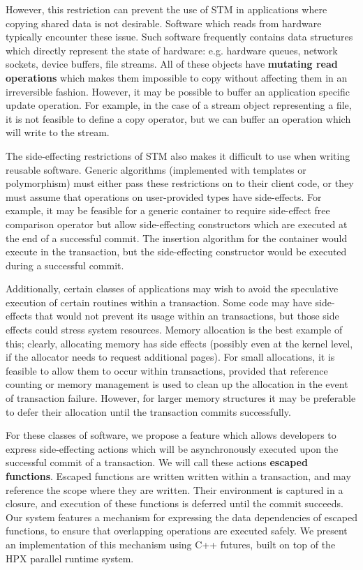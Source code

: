 \documentclass[conference]{IEEEtran}
\begin{document}
However, this restriction can prevent the use of STM in applications where copying shared data is not desirable. Software which reads from hardware typically encounter these issue. Such software frequently contains data structures which directly represent the state of hardware: e.g. hardware queues, network sockets, device buffers, file streams. All of these objects have \textbf{mutating read operations} which makes them impossible to copy without affecting them in an irreversible fashion. However, it may be possible to buffer an application specific update operation. For example, in the case of a stream object representing a file, it is not feasible to define a copy operator, but we can buffer an operation which will write to the stream. 

The side-effecting restrictions of STM also makes it difficult to use when writing reusable software. Generic algorithms (implemented with templates or polymorphism) must either pass these restrictions on to their client code, or they must assume that operations on user-provided types have side-effects. For example, it may be feasible for a generic container to require side-effect free comparison operator but allow side-effecting constructors which are executed at the end of a successful commit. The insertion algorithm for the container would execute in the transaction, but the side-effecting constructor would be executed during a successful commit.

Additionally, certain classes of applications may wish to avoid the speculative execution of certain routines within a transaction. Some code may have side-effects that would not prevent its usage within an transactions, but those side effects could stress system resources. Memory allocation is the best example of this; clearly, allocating memory has side effects (possibly even at the kernel level, if the allocator needs to request additional pages). For small allocations, it is feasible to allow them to occur within transactions, provided that reference counting or memory management is used to clean up the allocation in the event of transaction failure. However, for larger memory structures it may be preferable to defer their allocation until the transaction commits successfully.

For these classes of software, we propose a feature which allows developers to express side-effecting actions which will be asynchronously executed upon the successful commit of a transaction. We will call these actions \textbf{escaped functions}. Escaped functions are written written within a transaction, and may reference the scope where they are written. Their environment is captured in a closure, and execution of these functions is deferred until the commit succeeds.  Our system features a mechanism for expressing the data dependencies of escaped functions, to ensure that overlapping operations are executed safely. We present an implementation of this mechanism using C++ futures, built on top of the HPX parallel runtime system.
\end{document}
